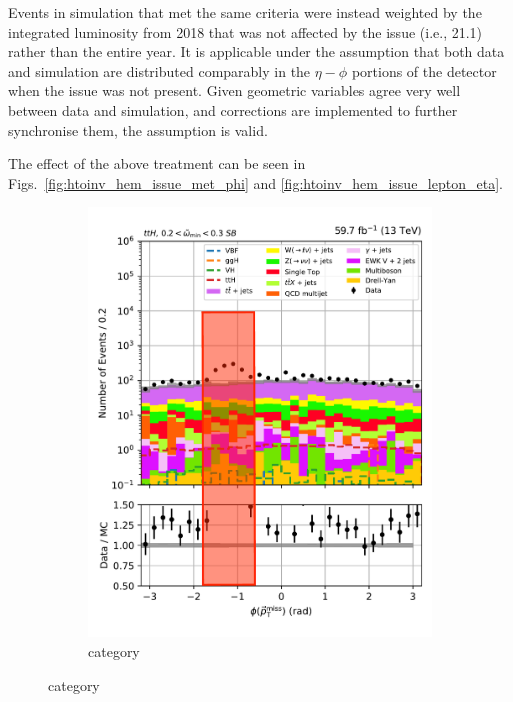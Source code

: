 \medskip

\noindent{}Events in simulation that met the same criteria were instead weighted by the integrated luminosity from 2018 that was not affected by the issue (i.e., 21.1\fbinv) rather than the entire year. It is applicable under the assumption that both data and simulation are distributed comparably in the $\eta-\phi$ portions of the detector when the issue was not present. Given geometric variables agree very well between data and simulation, and corrections are implemented to further synchronise them, the assumption is valid.

The effect of the above treatment can be seen in Figs.~\ref{fig:htoinv_hem_issue_met_phi} and \ref{fig:htoinv_hem_issue_lepton_eta}.

\begin{figure}[htbp]
    \centering
    \begin{subfigure}[b]{0.34\textwidth}
        \includegraphics[width=\textwidth]{figures/hem_issue/sideband_4/met_phi/met_phi_ttH_before_annotated.pdf}
        \caption{\ttH category}
    \end{subfigure}

\end{figure}
